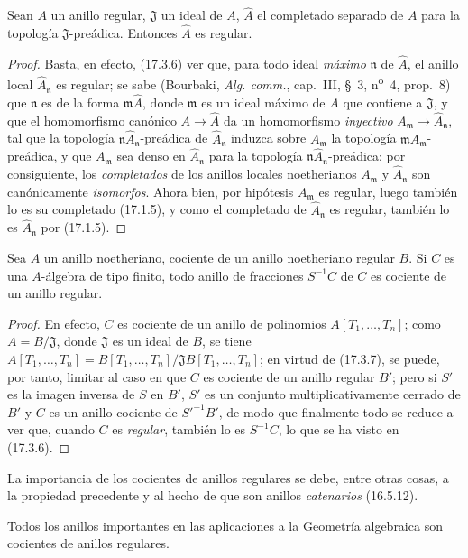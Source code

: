 \begin{lemma}[17.3.8.1]
\label{0.17.3.8.1-es}
Sean $A$ un anillo regular, $\mathfrak{J}$ un ideal de $A$,
$\widehat{A}$ el completado separado de $A$ para la topología
$\mathfrak{J}$-preádica. Entonces $\widehat{A}$ es regular.
\end{lemma}

\begin{proof}
Basta, en efecto, (17.3.6) ver que, para todo ideal \emph{máximo}
$\mathfrak{n}$ de $\widehat{A}$, el anillo local
$\widehat{A}_{\mathfrak{n}}$ es regular; se sabe (Bourbaki,
\emph{Alg. comm.}, cap.~III, \S~3, n\textsuperscript{o}~4, prop.~8) que
$\mathfrak{n}$
es de la forma $\mathfrak{m}\widehat{A}$, donde $\mathfrak{m}$ es un ideal
máximo de $A$ que contiene a $\mathfrak{J}$, y que el homomorfismo canónico
$A\to\widehat{A}$ da un homomorfismo \emph{inyectivo}
$A_{\mathfrak{m}}\to\widehat{A}_{\mathfrak{n}}$, tal que la topología
$\mathfrak{n}\widehat{A}_{\mathfrak{n}}$-preádica de
$\widehat{A}_{\mathfrak{n}}$ induzca sobre $A_{\mathfrak{m}}$ la topología
$\mathfrak{m}A_{\mathfrak{m}}$-preádica, y que $A_{\mathfrak{m}}$ sea denso
en $\widehat{A}_{\mathfrak{n}}$ para la topología
$\mathfrak{n}\widehat{A}_{\mathfrak{n}}$-preádica; por consiguiente, los
\emph{completados} de los anillos locales noetherianos $A_{\mathfrak{m}}$ y
$\widehat{A}_{\mathfrak{n}}$ son canónicamente \emph{isomorfos}. Ahora bien,
por hipótesis $A_{\mathfrak{m}}$ es regular, luego también lo es su completado
(17.1.5), y como el completado de $\widehat{A}_{\mathfrak{n}}$ es regular,
también lo es $\widehat{A}_{\mathfrak{n}}$ por (17.1.5).
\end{proof}

\begin{corollary}[17.3.9]
\label{0.17.3.9-es}
Sea $A$ un anillo noetheriano, cociente de un anillo noetheriano regular $B$.
Si $C$ es una $A$-álgebra de tipo finito, todo anillo de fracciones $S^{-1}C$
de $C$ es cociente de un anillo regular.
\end{corollary}

\begin{proof}
En efecto, $C$ es cociente de un anillo de polinomios $A[T_1,\ldots,T_n]$;
como $A=B/\mathfrak{J}$, donde $\mathfrak{J}$ es un ideal de $B$, se tiene
$A[T_1,\ldots,T_n]=B[T_1,\ldots,T_n]/\mathfrak{J}B[T_1,\ldots,T_n]$; en
virtud de (17.3.7), se puede, por tanto, limitar al caso en que $C$ es cociente
de un anillo regular $B'$; pero si $S'$ es la imagen inversa de $S$ en $B'$,
$S'$ es un conjunto multiplicativamente cerrado de $B'$ y $C$ es un anillo
cociente de $S'^{-1}B'$, de modo que finalmente todo se reduce a ver que,
cuando $C$ es \emph{regular}, también lo es $S^{-1}C$, lo que se ha visto en
(17.3.6).
\end{proof}

La importancia de los cocientes de anillos regulares se debe, entre otras
cosas, a la propiedad precedente y al hecho de que son anillos
\emph{catenarios} (16.5.12).

Todos los anillos importantes en las aplicaciones a la Geometría algebraica
son cocientes de anillos regulares.
